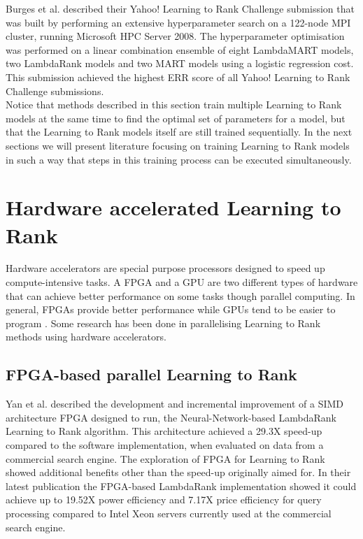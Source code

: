 Burges et al. \cite{Burges2011} described their Yahoo! Learning to Rank Challenge submission that was built by performing an extensive hyperparameter search on a 122-node \ac{MPI} cluster, running Microsoft HPC Server 2008. The hyperparameter optimisation was performed on a linear combination ensemble of eight LambdaMART models, two LambdaRank models and two MART models using a logistic regression cost. This submission achieved the highest \ac{ERR} score of all Yahoo! Learning to Rank Challenge submissions.\\

Notice that methods described in this section train multiple Learning to Rank models at the same time to find the optimal set of parameters for a model, but that the Learning to Rank models itself are still trained sequentially. In the next sections we will present literature focusing on training Learning to Rank models in such a way that steps in this training process can be executed simultaneously.\\

\section{Hardware accelerated Learning to Rank}
Hardware accelerators are special purpose processors designed to speed up compute-intensive tasks. A \ac{FPGA} and a \ac{GPU} are two different types of hardware that can achieve better performance on some tasks though parallel computing. In general, \ac{FPGA}s provide better performance while \ac{GPU}s tend to be easier to program \cite{Che2008}. Some research has been done in parallelising Learning to Rank methods using hardware accelerators.

\subsection{FPGA-based parallel Learning to Rank}
Yan et al. \cite{Yan2009,Yan2010,Yan2011,Yan2012} described the development and incremental improvement of a \ac{SIMD} architecture \ac{FPGA} designed to run, the Neural-Network-based LambdaRank Learning to Rank algorithm. This architecture achieved a 29.3X speed-up compared to the software implementation, when evaluated on data from a commercial search engine. The exploration of \ac{FPGA} for Learning to Rank showed additional benefits other than the speed-up originally aimed for. In their latest publication \cite{Yan2012} the \acs{FPGA}-based LambdaRank implementation showed it could achieve up to 19.52X power efficiency and 7.17X price efficiency for query processing compared to Intel Xeon servers currently used at the commercial search engine.\\

